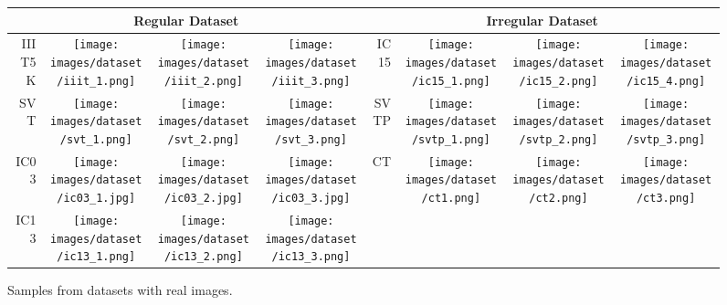 \documentclass[runningheads]{llncs}
\begin{document}
\begin{figure}
    \centering
    
\begin{center}
    

\begin{tabular}{| r | c  c  c  |  r | c  c  c |}

\hline
\multicolumn{4}{|c|}{\textbf{Regular Dataset} } & \multicolumn{4}{|c|}{\textbf{Irregular Dataset} } \\
\hline
IIIT5K 
&
\texttt{[image: images/dataset/iiit\_1.png]} & 
\texttt{[image: images/dataset/iiit\_2.png]} &
\texttt{[image: images/dataset/iiit\_3.png]}
&
IC15
&

\texttt{[image: images/dataset/ic15\_1.png]}
&
\texttt{[image: images/dataset/ic15\_2.png]}
&
\texttt{[image: images/dataset/ic15\_4.png]}


\\ 

SVT 
&
\texttt{[image: images/dataset/svt\_1.png]} 
& 
\texttt{[image: images/dataset/svt\_2.png]} 
&
\texttt{[image: images/dataset/svt\_3.png]}

&
SVTP 
&
\texttt{[image: images/dataset/svtp\_1.png]} & 
\texttt{[image: images/dataset/svtp\_2.png]} &
\texttt{[image: images/dataset/svtp\_3.png]}


\\ 


IC03 
&
\texttt{[image: images/dataset/ic03\_1.jpg]} & 
\texttt{[image: images/dataset/ic03\_2.jpg]} &
\texttt{[image: images/dataset/ic03\_3.jpg]}
&
CT 
&
\texttt{[image: images/dataset/ct1.png]} 
& \texttt{[image: images/dataset/ct2.png]} 
&
\texttt{[image: images/dataset/ct3.png]}

\\ 

IC13 
&
\texttt{[image: images/dataset/ic13\_1.png]} & 
\texttt{[image: images/dataset/ic13\_2.png]} &
\texttt{[image: images/dataset/ic13\_3.png]}
& 
{}
& 
{}
&
{}
&
{}
\\ 

\hline

\end{tabular}
\end{center}
    \caption{Samples from datasets with real images.}
    \label{fig:real_dataset}
\end{figure}
\end{document}
